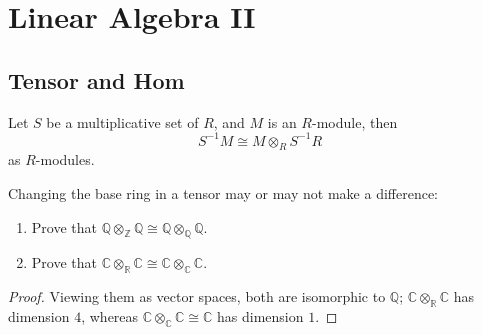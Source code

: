 \documentclass[openany]{book}
\newcommand{\R}{\mathbb{R}}
\newcommand{\C}{\mathbb{C}}
\newcommand{\Q}{\mathbb{Q}}
\begin{document}




















\chapter{Linear Algebra II}



\section{Tensor and Hom}
\begin{prop}
    Let $S$ be a multiplicative set of $R$, and $M$ is an $R$-module, then 
    \begin{equation*}
        S^{-1}M\cong M\otimes_R S^{-1}R
    \end{equation*}
    as $R$-modules.
\end{prop}

\begin{prob}[2.7]
    Changing the base ring in a tensor may or may not make a difference:
    
    \begin{enumerate}
        \item Prove that \( \mathbb{Q} \otimes_{\mathbb{Z}} \mathbb{Q} \cong \mathbb{Q} \otimes_{\mathbb{Q}} \mathbb{Q} \).
        \item Prove that \( \mathbb{C} \otimes_{\mathbb{R}} \mathbb{C} \cong \mathbb{C} \otimes_{\mathbb{C}} \mathbb{C} \).
    \end{enumerate}
    \end{prob}
\begin{proof}
    Viewing them as vector spaces, both are isomorphic to $\Q$; $\C\otimes_\R\C$ has dimension $4$, whereas $\C\otimes_\C\C\cong\C$ has dimension $1$.
\end{proof}
    
\end{document}
